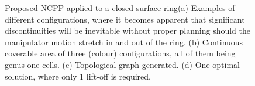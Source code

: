 \documentclass[journal]{IEEEtran}
\begin{document}
\begin{figure}[t]
\centering
{}
\caption{Proposed NCPP applied to a closed surface ring(a) Examples of different configurations, where it becomes apparent that significant discontinuities will be inevitable without proper planning should the manipulator motion stretch in and out of the ring.  (b) Continuous coverable area 
of three (colour) configurations, all of them being genus-one cells. (c) Topological graph generated. (d) One optimal solution, where 
only $1$ lift-off is required.}
\label{fig_ring_exp}
\end{figure}



\end{document}
